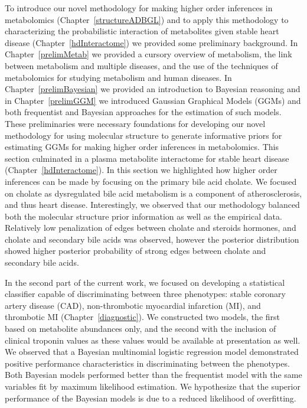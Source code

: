 \begin{DoubleSpace*}
To introduce our novel methodology for making higher order inferences in metabolomics (Chapter~\ref{structureADBGL}) and to apply this methodology to characterizing the probabilistic interaction of metabolites given stable heart disease (Chapter~\ref{hdInteractome}) we provided some preliminary background. In Chapter~\ref{prelimMetab} we provided a cursory overview of metabolism, the link between metabolism and multiple diseases, and the use of the techniques of metabolomics for studying metabolism and human diseases. In Chapter~\ref{prelimBayesian} we provided an introduction to Bayesian reasoning and in Chapter~\ref{prelimGGM} we introduced Gaussian Graphical Models (GGMs) and both frequentist and Bayesian approaches for the estimation of such models. These preliminaries were necessary foundations for developing our novel methodology for using molecular structure to generate informative priors for estimating GGMs for making higher order inferences in metabolomics. This section culminated in a plasma metabolite interactome for stable heart disease (Chapter~\ref{hdInteractome}). In this section we highlighted how higher order inferences can be made by focusing on the primary bile acid cholate. We focused on cholate as dysregulated bile acid metabolism is a component of atherosclerosis, and thus heart disease. Interestingly, we observed that our methodology balanced both the molecular structure prior information as well as the empirical data. Relatively low penalization of edges between cholate and steroids hormones, and cholate and secondary bile acids was observed, however the posterior distribution showed higher posterior probability of strong edges between cholate and secondary bile acids.

In the second part of the current work, we focused on developing a statistical classifier capable of discriminating between three phenotypes: stable coronary artery disease (CAD), non-thrombotic myocardial infarction (MI), and thrombotic MI (Chapter~\ref{diagnostic}). We constructed two models, the first based on metabolite abundances only, and the second with the inclusion of clinical troponin values as these values would be available at presentation as well. We observed that a Bayesian multinomial logistic regression model demonstrated positive performance characteristics in discriminating between the phenotypes. Both Bayesian models performed better than the frequentist model with the same variables fit by maximum likelihood estimation. We hypothesize that the superior performance of the Bayesian models is due to a reduced likelihood of overfitting. 


\end{DoubleSpace*}

